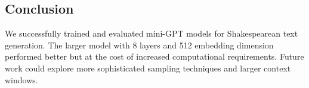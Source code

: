 \subsection{Conclusion}
We successfully trained and evaluated mini-GPT models for Shakespearean text generation. The larger model with 8 layers and 512 embedding dimension performed better but at the cost of increased computational requirements. Future work could explore more sophisticated sampling techniques and larger context windows.

